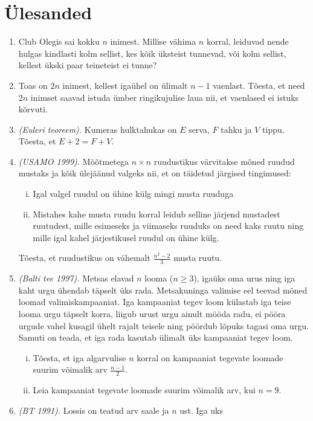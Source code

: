 \documentclass{article}
\begin{document}
\section{Ülesanded}
\begin{enumerate}
\item Club Olegis sai kokku $n$ inimest. Millise vähima $n$ korral,
  leiduvad nende hulgas kindlasti kolm sellist, kes kõik üksteist
  tunnevad, või kolm sellist, kellest ükski paar teineteist ei tunne?
\item Toas on $2n$ inimest, kellest igaühel on ülimalt $n-1$
  vaenlast. Tõesta, et need $2n$ inimset saavad istuda ümber
  ringikujulise laua nii, et vaenlased ei istuks kõrvuti.
\item \emph{(Euleri teoreem).} Kumeras hulktahukas on $E$ serva, $F$
  tahku ja $V$ tippu. Tõesta, et $E+2=F+V$.
\item \emph{(USAMO 1999).}  Mõõtmetega $n \times n$ ruudustikus
  värvitakse mõned ruudud mustaks ja kõik ülejäänud valgeks nii, et on
  täidetud järgised tingimused:
  \begin{enumerate}[(i)]
  \item Igal valgel ruudul on ühine külg mingi musta ruuduga
  \item Mistahes kahe musta ruudu korral leidub selline järjend
    mustadest ruutudest, mille esimeseks ja viimaseks ruuduks on need
    kaks ruutu ning mille igal kahel järjestikusel ruudul on ühine
    külg.
  \end{enumerate}
  Tõesta, et ruudustikus on vähemalt $\frac{n^2-2}{3}$ musta ruutu.
\item \emph{(Balti tee 1997).} Metsas elavad $n$ looma ($n \geq 3$),
  igaüks oma urus ning iga kaht urgu ühendab täpselt üks
  rada. Metsakuninga valimise eel teevad mõned loomad
  valimiskampaaniat. Iga kampaaniat tegev loom külastab iga teise
  looma urgu täpselt korra, liigub urust urgu ainult mööda radu, ei
  pööra urgude vahel kusagil ühelt rajalt teisele ning pöördub lõpuks
  tagasi oma urgu. Samuti on teada, et iga rada kasutab ülimalt üks
  kampaaniat tegev loom.
  \begin{enumerate}[(i)]
  \item Tõesta, et iga algarvulise $n$ korral on kampaaniat tegevate
    loomade suurim võimalik arv $\frac{n-1}{2}$.
  \item Leia kampaaniat tegevate loomade suurim võimalik arv, kui
    $n=9$.
  \end{enumerate}
\item \emph{(BT 1991).} Lossis on teatud arv saale ja $n$ ust. Iga uks

\end{enumerate}
\end{document}
